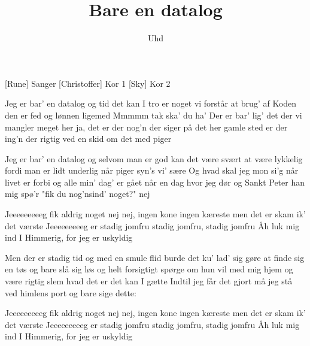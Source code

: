 \documentclass[a4paper,11pt]{article}
\title{Bare en datalog}
\author{Uhd}
\begin{document}
\maketitle

\begin{roles}
  [Rune] Sanger
  [Christoffer] Kor 1
  [Sky] Kor 2
\end{roles} 

\begin{props}
\end{props}


\begin{song}
  
  Jeg er bar' en datalog
  og tid det kan I tro
  er noget vi forstår at brug' af
  Koden den er fed
  og lønnen ligemed
  Mmmmm tak ska' du ha'
  Der er bar' lig' det der
  vi mangler meget her
  ja, det er der nog'n der siger
  på det her gamle sted
  er der ing'n der rigtig ved
  en skid om det med piger

  Jeg er bar' en datalog
  og selvom man er god
  kan det være svært at være
  lykkelig fordi
  man er lidt underlig
  når piger syn's vi' sære
  Og hvad skal jeg mon si'g
  når livet er forbi
  og alle min' dag' er gået
  når en dag hvor jeg dør
  og Sankt Peter han mig spø'r
  "fik du nog'nsind' noget?"
  nej
  
  Jeeeeeeeeeg fik aldrig noget
  nej nej, ingen kone
  ingen kæreste
  men det er skam
  ik' det værste
  Jeeeeeeeeeg er stadig jomfru
  stadig jomfru, stadig jomfru
  Åh luk mig ind I Himmerig, for jeg er uskyldig
  
  Men der er stadig tid
  og med en smule flid
  burde det ku' lad' sig gøre
  at finde sig en tøs
  og bare slå sig løs
  og helt forsigtigt spørge
  om hun vil med mig hjem
  og være rigtig slem
  hvad det er det kan I gætte
  Indtil jeg får det gjort
  må jeg stå ved himlens port
  og bare sige dette:
  
  Jeeeeeeeeeg fik aldrig noget
  nej nej, ingen kone
  ingen kæreste
  men det er skam
  ik' det værste
  Jeeeeeeeeeg er stadig jomfru
  stadig jomfru, stadig jomfru
  Åh luk mig ind I Himmerig, for jeg er uskyldig
  
\end{song}
\end{document}
